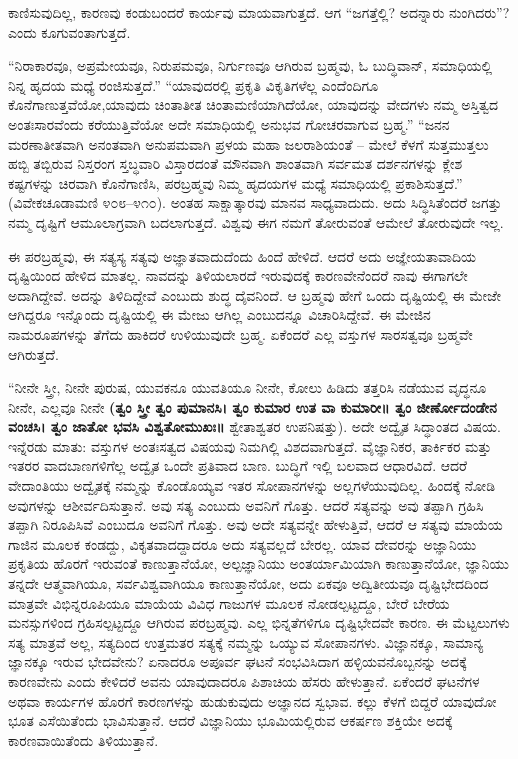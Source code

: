 ಕಾಣಿಸುವುದಿಲ್ಲ, ಕಾರಣವು ಕಂಡುಬಂದರೆ ಕಾರ್ಯವು ಮಾಯವಾಗುತ್ತದೆ. ಆಗ “ಜಗತ್ತೆಲ್ಲಿ? ಅದನ್ನಾರು ನುಂಗಿದರು”? ಎಂದು ಕೂಗುವಂತಾಗುತ್ತದೆ. 

“ನಿರಾಕಾರವೂ, ಅಪ್ರಮೇಯವೂ, ನಿರುಪಮವೂ, ನಿರ್ಗುಣವೂ ಆಗಿರುವ ಬ್ರಹ್ಮವು, ಓ ಬುದ್ಧಿವಾನ್​, ಸಮಾಧಿಯಲ್ಲಿ ನಿನ್ನ ಹೃದಯ ಮಧ್ಯೆ ರಂಜಿಸುತ್ತದೆ.” “ಯಾವುದರಲ್ಲಿ ಪ್ರಕೃತಿ ವಿಕೃತಿಗಳೆಲ್ಲ ಎಂದೆಂದಿಗೂ ಕೊನೆಗಾಣುತ್ತವೆಯೋ,\break ಯಾವುದು ಚಿಂತಾತೀತ ಚಿಂತಾಮಣಿಯಾಗಿದೆಯೋ, ಯಾವುದನ್ನು ವೇದಗಳು ನಮ್ಮ ಅಸ್ತಿತ್ವದ ಅಂತಃಸಾರವೆಂದು ಕರೆಯುತ್ತಿವೆಯೋ ಅದೇ ಸಮಾಧಿಯಲ್ಲಿ ಅನುಭವ ಗೋಚರವಾಗುವ ಬ್ರಹ್ಮ.” “ಜನನ ಮರಣಾತೀತವಾಗಿ ಅನಂತವಾಗಿ ಅನುಪಮವಾಗಿ ಪ್ರಳಯ ಮಹಾ ಜಲರಾಶಿಯಂತೆ – ಮೇಲೆ ಕೆಳಗೆ ಸುತ್ತಮುತ್ತಲು ಹಬ್ಬಿ ತಬ್ಬಿರುವ ನಿಸ್ತರಂಗ ಸ್ತಬ್ಧವಾರಿ ವಿಸ್ತಾರದಂತೆ ಮೌನವಾಗಿ ಶಾಂತವಾಗಿ ಸರ್ವಮತ ದರ್ಶನಗಳನ್ನು ಕ್ಲೇಶ ಕಷ್ಟಗಳನ್ನು ಚಿರವಾಗಿ ಕೊನೆಗಾಣಿಸಿ, ಪರಬ್ರಹ್ಮವು ನಿಮ್ಮ ಹೃದಯಗಳ ಮಧ್ಯೆ ಸಮಾಧಿಯಲ್ಲಿ ಪ್ರಕಾಶಿಸುತ್ತದೆ.” (ವಿವೇಕಚೂಡಾಮಣಿ ೪೦೮–೪೧೦). ಅಂತಹ ಸಾಕ್ಷಾತ್ಕಾರವು ಮಾನವ ಸಾಧ್ಯವಾದುದು. ಅದು ಸಿದ್ಧಿಸಿತೆಂದರೆ ಜಗತ್ತು ನಮ್ಮ ದೃಷ್ಟಿಗೆ ಆಮೂಲಾಗ್ರವಾಗಿ ಬದಲಾಗುತ್ತದೆ. ವಿಶ್ವವು ಈಗ ನಮಗೆ ತೋರುವಂತೆ ಆಮೇಲೆ ತೋರುವುದೇ ಇಲ್ಲ. 

ಈ ಪರಬ್ರಹ್ಮವು, ಈ ಸತ್ಯಸ್ಯ ಸತ್ಯವು ಅಜ್ಞಾತವಾದುದೆಂದು ಹಿಂದೆ ಹೇಳಿದೆ. ಆದರೆ ಅದು ಅಜ್ಞೇಯತಾವಾದಿಯ ದೃಷ್ಟಿಯಿಂದ ಹೇಳಿದ ಮಾತಲ್ಲ. ನಾವದನ್ನು ತಿಳಿಯಲಾರದೆ ಇರುವುದಕ್ಕೆ ಕಾರಣವೇನೆಂದರೆ ನಾವು ಈಗಾಗಲೇ ಅದಾಗಿದ್ದೇವೆ. ಅದನ್ನು ತಿಳಿದಿದ್ದೇವೆ ಎಂಬುದು ಶುದ್ಧ ದೈವನಿಂದೆ. ಆ ಬ್ರಹ್ಮವು ಹೇಗೆ ಒಂದು ದೃಷ್ಟಿಯಲ್ಲಿ ಈ ಮೇಜೇ ಆಗಿದ್ದರೂ ಇನ್ನೊಂದು ದೃಷ್ಟಿಯಲ್ಲಿ ಈ ಮೇಜು ಆಗಿಲ್ಲ ಎಂಬುದನ್ನೂ ವಿಚಾರಿಸಿದ್ದೇವೆ. ಈ ಮೇಜಿನ ನಾಮರೂಪಗಳನ್ನು ತೆಗೆದು ಹಾಕಿದರೆ ಉಳಿಯುವುದೇ ಬ್ರಹ್ಮ. ಏಕೆಂದರೆ ಎಲ್ಲ ವಸ್ತುಗಳ ಸಾರಸತ್ವವೂ ಬ್ರಹ್ಮವೇ ಆಗಿರುತ್ತದೆ. 

“ನೀನೇ ಸ್ತ್ರೀ, ನೀನೇ ಪುರುಷ, ಯುವಕನೂ ಯುವತಿಯೂ ನೀನೇ, ಕೋಲು ಹಿಡಿದು ತತ್ತರಿಸಿ ನಡೆಯುವ ವೃದ್ಧನೂ ನೀನೇ, ಎಲ್ಲವೂ ನೀನೇ \textbf{(ತ್ವಂ ಸ್ತ್ರೀ ತ್ವಂ ಪುಮಾನಸಿ। ತ್ವಂ ಕುಮಾರ ಉತ ವಾ ಕುಮಾರೀ॥ ತ್ವಂ ಜೀರ್ಣೋದಂಡೇನ ವಂಚಸಿ। ತ್ವಂ ಜಾತೋ ಭವಸಿ ವಿಶ್ವತೋಮುಖಃ॥} ಶ್ವೇತಾಶ್ವತರ ಉಪನಿಷತ್ತು). ಅದೇ ಅದ್ವೈತ ಸಿದ್ಧಾಂತದ ವಿಷಯ. ಇನ್ನೆರಡು ಮಾತು: ವಸ್ತುಗಳ ಅಂತಃಸತ್ವದ ವಿಷಯವು ನಿಮಗಿಲ್ಲಿ ವಿಶದವಾಗುತ್ತದೆ. ವೈಜ್ಞಾನಿಕರ, ತಾರ್ಕಿಕರ ಮತ್ತು ಇತರರ ವಾದಬಾಣಗಳಿಗೆಲ್ಲ ಅದ್ವೈತ ಒಂದೇ ಪ್ರತಿವಾದ ಬಾಣ. ಬುದ್ಧಿಗೆ ಇಲ್ಲಿ ಬಲವಾದ ಆಧಾರವಿದೆ. ಆದರೆ ವೇದಾಂತಿಯು ಅದ್ವೈತಕ್ಕೆ ನಮ್ಮನ್ನು ಕೊಂಡೊಯ್ಯವ ಇತರ ಸೋಪಾನಗಳನ್ನು ಅಲ್ಲಗಳೆಯುವುದಿಲ್ಲ. ಹಿಂದಕ್ಕೆ ನೋಡಿ ಅವುಗಳನ್ನು ಆಶೀರ್ವದಿಸುತ್ತಾನೆ. ಅವು ಸತ್ಯ ಎಂಬುದು ಅವನಿಗೆ ಗೊತ್ತು. ಆದರೆ ಸತ್ಯವನ್ನು ಅವು ತಪ್ಪಾಗಿ ಗ್ರಹಿಸಿ ತಪ್ಪಾಗಿ ನಿರೂಪಿಸಿವೆ ಎಂಬುದೂ ಅವನಿಗೆ ಗೊತ್ತು. ಅವು ಅದೇ ಸತ್ಯವನ್ನೇ ಹೇಳುತ್ತಿವೆ, ಆದರೆ ಆ ಸತ್ಯವು ಮಾಯೆಯ ಗಾಜಿನ ಮೂಲಕ ಕಂಡದ್ದು, ವಿಕೃತವಾದದ್ದಾದರೂ ಅದು ಸತ್ಯವಲ್ಲದೆ ಬೇರಲ್ಲ. ಯಾವ ದೇವರನ್ನು ಅಜ್ಞಾನಿಯು ಪ್ರಕೃತಿಯ ಹೊರಗೆ ಇರುವಂತೆ ಕಾಣುತ್ತಾನೆಯೋ, ಅಲ್ಪಜ್ಞಾನಿಯು ಅಂತರ್ಯಾಮಿಯಾಗಿ ಕಾಣುತ್ತಾನೆಯೋ, ಜ್ಞಾನಿಯು ತನ್ನದೇ ಆತ್ಮವಾಗಿಯೂ, ಸರ್ವವಿಶ್ವವಾಗಿಯೂ ಕಾಣುತ್ತಾನೆಯೋ, ಅದು ಏಕವೂ ಅದ್ವಿತೀಯವೂ ದೃಷ್ಟಿಭೇದದಿಂದ ಮಾತ್ರವೇ ವಿಭಿನ್ನರೂಪಿಯೂ ಮಾಯೆಯ ವಿವಿಧ ಗಾಜುಗಳ ಮೂಲಕ ನೋಡಲ್ಪಟ್ಟದ್ದೂ, ಬೇರೆ ಬೇರೆಯ ಮನಸ್ಸುಗಳಿಂದ ಗ್ರಹಿಸಲ್ಪಟ್ಟದ್ದೂ ಆಗಿರುವ ಪರಬ್ರಹ್ಮವು. ಎಲ್ಲ ಭಿನ್ನತೆಗಳಿಗೂ ದೃಷ್ಟಿಭೇದವೇ ಕಾರಣ. ಈ ಮೆಟ್ಟಲುಗಳು ಸತ್ಯ ಮಾತ್ರವೆ ಅಲ್ಲ, ಸತ್ಯದಿಂದ ಉತ್ತಮತರ ಸತ್ಯಕ್ಕೆ ನಮ್ಮನ್ನು ಒಯ್ಯುವ ಸೋಪಾನಗಳು. ವಿಜ್ಞಾನಕ್ಕೂ, ಸಾಮಾನ್ಯ ಜ್ಞಾನಕ್ಕೂ ಇರುವ ಭೇದವೇನು? ಏನಾದರೂ ಅಪೂರ್ವ ಘಟನೆ ಸಂಭವಿಸಿದಾಗ ಹಳ್ಳಿಯವನೊಬ್ಬನನ್ನು ಅದಕ್ಕೆ ಕಾರಣವೇನು ಎಂದು ಕೇಳಿದರೆ ಅವನು ಯಾವುದಾದರೂ ಪಿಶಾಚಿಯ ಹೆಸರು ಹೇಳುತ್ತಾನೆ. ಏಕೆಂದರೆ ಘಟನೆಗಳ ಅಥವಾ ಕಾರ್ಯಗಳ ಹೊರಗೆ ಕಾರಣಗಳನ್ನು ಹುಡುಕುವುದು ಅಜ್ಞಾನದ ಸ್ವಭಾವ. ಕಲ್ಲು ಕೆಳಗೆ ಬಿದ್ದರೆ ಯಾವುದೋ ಭೂತ ಎಸೆಯಿತೆಂದು ಭಾವಿಸುತ್ತಾನೆ. ಆದರೆ ವಿಜ್ಞಾನಿಯು ಭೂಮಿಯಲ್ಲಿರುವ ಆಕರ್ಷಣ ಶಕ್ತಿಯೇ ಅದಕ್ಕೆ ಕಾರಣವಾಯಿತೆಂದು ತಿಳಿಯುತ್ತಾನೆ. 

